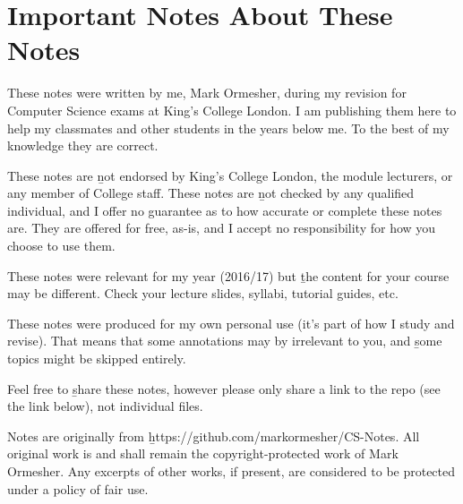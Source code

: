 \section{Important Notes About These Notes}

These notes were written by me, Mark Ormesher, during my revision for Computer Science exams at King's College London. I am publishing them here to help my classmates and other students in the years below me. To the best of my knowledge they are correct.

These notes are \b{not endorsed} by King's College London, the module lecturers, or any member of College staff. These notes are \b{not checked} by any qualified individual, and I offer no guarantee as to how accurate or complete these notes are. They are offered for free, as-is, and I accept no responsibility for how you choose to use them.

These notes were relevant for my year (2016/17) but \b{the content for your course may be different}. Check your lecture slides, syllabi, tutorial guides, etc.

These notes were produced for my own personal use (it's part of how I study and revise). That means that some annotations may by irrelevant to you, and \b{some topics might be skipped} entirely.

Feel free to \b{share} these notes, however please only share a link to the repo (see the link below), not individual files.

Notes are originally from \b{https://github.com/markormesher/CS-Notes}. All original work is and shall remain the copyright-protected work of Mark Ormesher. Any excerpts of other works, if present, are considered to be protected under a policy of fair use.